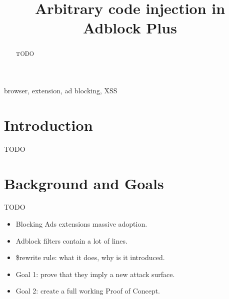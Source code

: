 \documentclass[conference]{IEEEtran}
\begin{document}
\title{Arbitrary code injection in Adblock Plus
}

\author{
\and
{}
\and
{}
}

\maketitle

\begin{abstract}
TODO
\end{abstract}

\begin{IEEEkeywords}
browser, extension, ad blocking, XSS
\end{IEEEkeywords}

\section{Introduction}
TODO \cite{abp_code_injection}

\section{Background and Goals}
TODO
\begin{itemize}
\item Blocking Ads extensions massive adoption.
\item Adblock filters contain a lot of lines.
\item \$rewrite rule: what it does, why is it introduced.
\item Goal 1: prove that they imply a new attack surface.
\item Goal 2: create a full working Proof of Concept.
\end{itemize}
\end{document}
